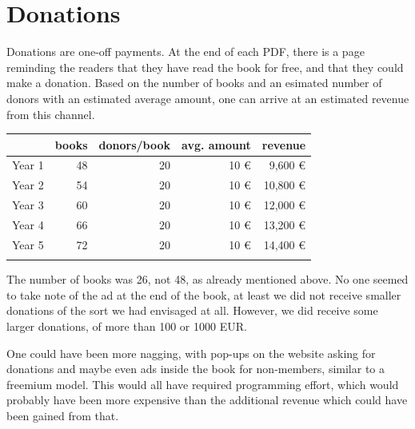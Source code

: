 \documentclass[nonflat,smallfont
]{langsci/langscibook}
\newcommand{\background}[1]{ 
  \vspace{5mm}
  \renewcommand{\tblslinecolour}{lsDarkBlue}
  \tblssy[red]{explore2}{Background}{\vspace*{-5mm}#1}
}
\newcommand{\langscisolution}[1]{
  \renewcommand{\tblslinecolour}{lsLightBlue}
  \tblssy{langsci}{LangSci solution}{\vspace*{-5mm}#1}
}
\newcommand{\evaluation}[1]{
  \renewcommand{\tblslinecolour}{lsLightOrange}
  \tblssy{receipt}{Evaluation}{\vspace*{-5mm}#1}
}
\newcommand{\othersolutions}[1]{
  \renewcommand{\tblslinecolour}{lsDarkGreenOne}
  \tblssy{more}{Other solutions}{\vspace*{-5mm}#1}
}
\renewcommand{\tblssy}[4][black!12]{%
  \renewcommand{\langscisymbol}{#2}\renewcommand{\tblsboxcolor}{#1}
  \begin{mdframed}[style=yellowexercise,frametitle={#3}]
    #4
  \end{mdframed}
}
\begin{document}
\section{Donations}\vspace*{5mm}
\background{Donations are one-off payments. At the end of each PDF, there is a page reminding the readers that they have read the book for free, and that they could make a donation. Based on the number of books and an esimated number of donors with an estimated average amount, one can arrive at an estimated revenue from this channel.}
\langscisolution{
\begin{tabularx}{\textwidth}{Xrrrr}
\lsptoprule 
          &   books   & donors/book &   avg. amount     &  revenue\\
\midrule  
Year 1   &   48      &            20      &            10 €     &                      9,600 €  \\
Year 2   &   54      &            20      &            10 €     &                      10,800 € \\
Year 3   &   60      &            20      &            10 €     &                      12,000 € \\
Year 4   &   66      &            20      &            10 €     &                      13,200 € \\
Year 5   &   72      &            20      &            10 €     &                      14,400 € \\
\lspbottomrule
\end{tabularx}
}
\evaluation{
The number of books was 26, not 48, as already mentioned above. No one seemed to take note of the ad at the end of the book, at least we did not receive smaller donations of the sort we had envisaged at all. However, we did receive some larger donations, of more than 100 or 1000 EUR. 
}
\othersolutions{One could have been more nagging, with pop-ups on the website asking for donations and maybe even ads inside the book for non-members, similar to a freemium model. This would all have required programming effort, which would probably have been more expensive than the additional revenue which could have been gained from that. }
\end{document}
